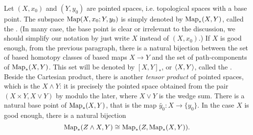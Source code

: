 {Let $(X,x_0)$ and $(Y,y_0)$ are pointed spaces, i.e. 
topological spaces with a base point. 
The subspace $\operatorname{Map}(X,x_0;Y,y_0)$ is simply denoted by 
$\operatorname{Map}_{\ast}(X,Y)$, called the . 
(In many case, the base point is clear or irrelevant to the 
discussion, we should simplify our notation by just write $X$ 
instead of $(X,x_0)$.) 
If $X$ is good enough, from the previous paragraph, 
there is a natural bijection between the set of 
based homotopy classes of based maps $X\to Y$ 
and the set of path-components of $\operatorname{Map}_{\ast}(X,Y)$. 
This set will be denoted by $[X,Y]_{\ast}$, or $\langle X,Y\rangle$, 
called the . 
Beside the Cartesian product, 
there is another \emph{tensor product} of pointed spaces, 
which is the  $X\wedge Y$: 
it is precisely the pointed space obtained from the pair
$(X\times Y,X\vee Y)$ by modulo the later, 
where $X\vee Y$ is the wedge sum. 
There is a natural base point of $\operatorname{Map}_{\ast}(X,Y)$, that 
is the map $\widetilde{y_0}\colon X\to\{y_0\}$. 
In the case $X$ is good enough, there is a natural bijection 
\[
\operatorname{Map}_{\ast}(Z\wedge X,Y)\cong\operatorname{Map}_{\ast}(Z,\operatorname{Map}_{\ast}(X,Y)).
\]

}


